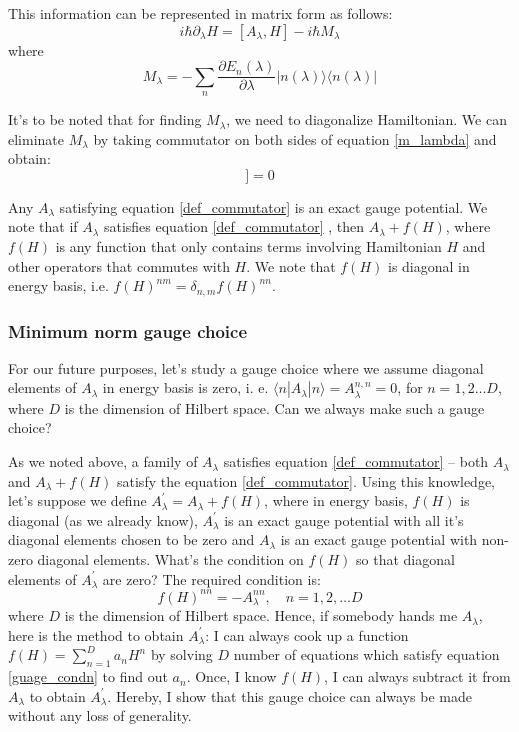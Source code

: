 \documentclass[11pt,a4paper]{article}
\begin{document}
This information can be represented in matrix form as follows:
\begin{equation}
i \hbar \partial_{\lambda} H= [ A_{\lambda}, H] -i \hbar M_{\lambda} 
\label{m_lambda}
\end{equation}
where 
\begin{equation}
M_{\lambda} = - \sum_n \dfrac{\partial E_n (\lambda)}{\partial \lambda} | n (\lambda) \rangle \langle n (\lambda) |
\end{equation}

It's to be noted that for finding $M_{\lambda}$, we need to diagonalize Hamiltonian. We can eliminate $M_{\lambda}$ by taking commutator on both sides of equation \ref{m_lambda} and obtain:
\begin{equation}
[H, i \hbar \partial_{\lambda}H - [A_{\lambda}, H]]=0
\label{def_commutator}
\end{equation}

Any $A_{\lambda}$ satisfying equation \ref{def_commutator} is an exact gauge potential. We note that  if $A_{\lambda}$ satisfies equation \ref{def_commutator} , then  $A_{\lambda}+ f(H)$, where $f(H)$ is any function that only contains terms involving Hamiltonian $H$ and other operators that commutes with $H$. We note that $f(H)$ is diagonal in energy basis, i.e. $f(H)^{nm}= \delta_{n,m} f(H)^{nn}$.
\subsubsection{Minimum norm gauge choice}
For our future purposes, let's study a gauge choice where we assume diagonal elements of $A_{\lambda}$ in energy basis is zero, i. e.  $ \langle n |A_{\lambda}|n\rangle= A_{\lambda}^{n,n} =0$, for $n=1,2 \ldots D$, where $D$ is the dimension of Hilbert space.  Can we always make such a gauge choice?

As we noted above,  a family of $A_{\lambda}$ satisfies equation \ref{def_commutator} -- both $A_{\lambda}$ and $A_{\lambda} + f(H)$ satisfy the equation \ref{def_commutator}. Using this knowledge, let's suppose we define $A_{\lambda}^{\prime}= A_{\lambda} + f(H)$, where in energy basis, $f(H)$ is diagonal (as we already know), $A_{\lambda}^{\prime}$  is an exact gauge potential with all it's diagonal elements chosen to be zero and $A_{\lambda}$ is an exact gauge potential with non-zero diagonal elements. What's the condition on $f(H)$ so that diagonal elements of $A_{\lambda}^{\prime}$  are zero? The required condition is:
\begin{equation}
 f(H)^{nn}= -A_{\lambda}^{nn}, \quad n=1,2, \ldots D
 \label{guage_condn}
\end{equation}
  where $D$ is the dimension of Hilbert space. Hence, if somebody hands me $A_{\lambda}$, here is the method to obtain $A_{\lambda}^{\prime}$: I can always cook up a function $f(H)= \sum_{n=1}^D a_n H^n$ by solving $D$ number of equations which satisfy equation \ref{guage_condn} to find out $a_n$. Once, I know $f(H)$, I can always subtract it from $A_{\lambda}$ to obtain $A_{\lambda}^{\prime}$. Hereby, I show that this gauge choice can always be made without any loss of generality.
\end{document}
